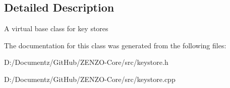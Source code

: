 \subsection{Detailed Description}
A virtual base class for key stores 

The documentation for this class was generated from the following files\+:\begin{DoxyCompactItemize}
\item 
D\+:/\+Documentz/\+Git\+Hub/\+Z\+E\+N\+Z\+O-\/\+Core/src/keystore.\+h\item 
D\+:/\+Documentz/\+Git\+Hub/\+Z\+E\+N\+Z\+O-\/\+Core/src/keystore.\+cpp\end{DoxyCompactItemize}

